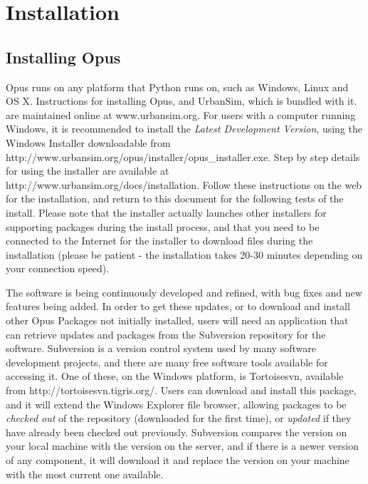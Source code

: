 
\chapter{Installation}
\label{chapter:installation}


\section{Installing Opus}
Opus runs on any platform that Python runs on, such as Windows, Linux and OS X.  Instructions for installing Opus, and UrbanSim, which is bundled with it. are maintained online at www.urbansim.org.  For users with a computer running Windows, it is recommended to install the \emph{Latest Development Version}, using the Windows Installer downloadable from http://www.urbansim.org/opus/installer/opus\_installer.exe.  Step by step details for using the installer are available at http://www.urbansim.org/docs/installation.  Follow these instructions on the web for the installation, and return to this document for the following tests of the install.  Please note that the installer actually launches other installers for supporting packages during the install process, and that you need to be connected to the Internet for the installer to download files during the installation (please be patient - the installation takes 20-30 minutes depending on your connection speed).

The software is being continuously developed and refined, with bug fixes and new features being added.  In order to get these updates, or to download and install other Opus Packages not initially installed, users will need an application that can retrieve updates and packages from the Subversion repository for the software.  Subversion is a version control system used by many software development projects, and there are many free software tools available for accessing it.  One of these, on the Windows platform, is Tortoisesvn, available from http://tortoisesvn.tigris.org/.  Users can download and install this package, and it will extend the Windows Explorer file browser, allowing packages to be \emph{checked out} of the repository (downloaded for the first time), or \emph{updated} if they have already been checked out previously.  Subversion compares the version on your local machine with the version on the server, and if there is a newer version of any component, it will download it and replace the version on your machine with the most current one available.

